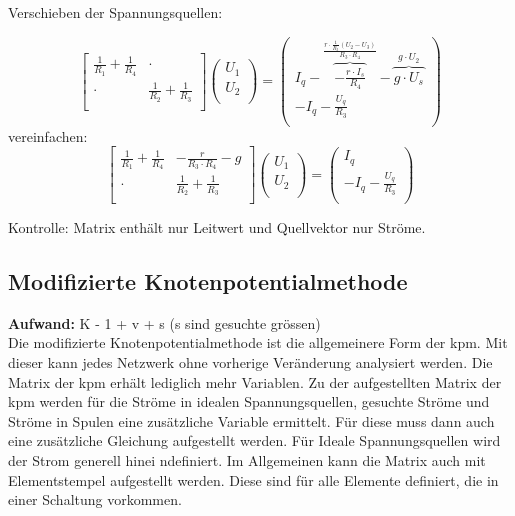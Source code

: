 Verschieben der Spannungsquellen:

\begin{center}
    
\end{center}

\[
\begin{bmatrix}
    \frac{1}{R_1} + \frac{1}{R_4} & \cdot \\
    \cdot & \frac{1}{R_2} + \frac{1}{R_3} \\
\end{bmatrix}
\begin{pmatrix}
    U_1\\
    U_2\\
\end{pmatrix}
=
\begin{pmatrix}
    I_q - \overbrace{-\frac{r\cdot I_s}{R_4}}^{\frac{r \cdot \frac{1}{R_3}(U_2 - U_3)}{R_3\cdot R_4}} - \overbrace{g\cdot U_s}^{g \cdot U_2}\\
    -I_q - \frac{U_q}{R_3}\\
\end{pmatrix}
\]
vereinfachen:
\[
\begin{bmatrix}
    \frac{1}{R_1} + \frac{1}{R_4} & -\frac{r}{R_3\cdot R_4}-g \\
    \cdot & \frac{1}{R_2} + \frac{1}{R_3} \\
\end{bmatrix}
\begin{pmatrix}
    U_1\\
    U_2\\
\end{pmatrix}
=
\begin{pmatrix}
    I_q\\
    -I_q - \frac{U_q}{R_3}\\
\end{pmatrix}
\]

Kontrolle: Matrix enthält nur Leitwert und Quellvektor nur Ströme.

\subsection{Modifizierte Knotenpotentialmethode}

\textbf{Aufwand:} K - 1 + v + s (s sind gesuchte grössen)\\

Die modifizierte Knotenpotentialmethode ist die allgemeinere Form der kpm. 
Mit dieser kann jedes Netzwerk ohne vorherige Veränderung analysiert werden. 
Die Matrix der kpm erhält lediglich mehr Variablen. 
Zu der aufgestellten Matrix der kpm werden für die Ströme in idealen Spannungsquellen, gesuchte Ströme und Ströme in Spulen eine zusätzliche Variable ermittelt.  
Für diese muss dann auch eine zusätzliche Gleichung aufgestellt werden. 
Für Ideale Spannungsquellen wird der Strom generell hinei ndefiniert.
Im Allgemeinen kann die Matrix auch mit Elementstempel aufgestellt werden.
Diese sind für alle Elemente definiert, die in einer Schaltung vorkommen. 

